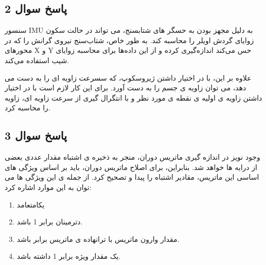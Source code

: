\subsection{ پاسخ سوال 2}
سنسور 
IMU
به دلیل مجهز بودن به حسگر های شتابسنج، می تواند در حالت سکون زوایای گردش  اویلر را محاسبه کند. به طور خاص، شتاب‌سنج نیروی گرانش را که در محورهای X و Y حس می‌کند اندازه‌گیری کرده و از این داده‌ها برای محاسبه زوایای شیب استفاده می‌کند.

علاوه بر این، با در اختیار داشتن ژیروسکوپ، که سسرعت زاویه ای را به دست می دهد، می توان زاویه ی جسم را به دست آورد. برای این کار لازم است با در اختیار داشتن زاویه ی اولیه ی نقطه ی مورد نظر و با انتگرال گیری از سرعت زاویه ای، زاویه را محاسبه کرد.


\subsection{ پاسخ سوال 3}
وجود نویز در اندازه گیری ماتریس دوران، منجر به ذخیره ی اشتباه مقدار عددی بعضی از درایه ها خواهد شد. بنابراین، برای اصلاح ماتریس دوران، باید بر اساس ویژگی های اساسی این ماتریس، مقادیر اشتباه را پیدا و تصحیح کرد. از جمله ی این ویژگی ها می توان به این موارد اشاره کرد:

\begin{enumerate}
	\item یکامتعامد
	\item دترمینان برابر 1 باشد.
	\item مقدار وارون ماتریس با ترانهاده ی ماتریس برابر باشد.
	\item یک مقدار ویژه برابر 1 داشته باشد.
\end{enumerate}

